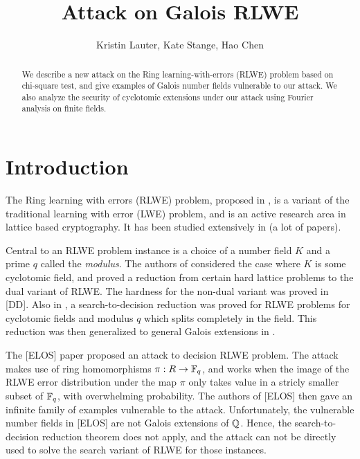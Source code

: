 \documentclass{amsart}
\title{Attack on Galois RLWE}
\author{Kristin Lauter, Kate Stange, Hao Chen}
\begin{document}
\maketitle

\begin{abstract}
We describe a new attack on the Ring learning-with-errors (RLWE) problem based on chi-square test, and give examples of Galois number fields vulnerable to our attack. We also analyze the security of cyclotomic extensions under our attack using Fourier analysis on finite fields.

\end{abstract}

\section{Introduction}
The Ring learning with errors (RLWE) problem, proposed in \cite{lyubashevsky2013ideal}, is a variant of the traditional learning with error (LWE) problem, and is an active research area in lattice based cryptography. It has been studied extensively in (a lot of papers).

Central to an RLWE problem instance is a choice of a number field $K$ and a prime $q$ called the {\it modulus}. The authors of \cite{lyubashevsky2013ideal} considered the case where $K$ is some cyclotomic field, and proved a reduction from certain hard lattice problems to the dual variant of RLWE. The hardness for the non-dual variant was proved in [DD]. Also in \cite{lyubashevsky2013ideal}, a search-to-decision reduction was proved for RLWE problems for cyclotomic fields and modulus $q$ which splits completely in the field. This reduction was then generalized to general Galois extensions in \cite{eisentrager2014weak}.

The [ELOS] paper proposed an attack to decision RLWE problem. The attack makes use of ring homomorphisms $\pi: R \to \mathbb{F}_q$, and works when the image of the RLWE error distribution under the map $\pi$ only takes value in a stricly smaller subset of $\mathbb{F}_q$, with overwhelming probability. The authors of [ELOS] then gave an infinite family of examples vulnerable to the attack. Unfortunately, the vulnerable number fields in [ELOS] are not Galois extensions of $\mathbb{Q}$. Hence, the search-to-decision reduction theorem does not apply, and the attack can not be directly used to solve the search variant of RLWE for those instances.
\end{document}
